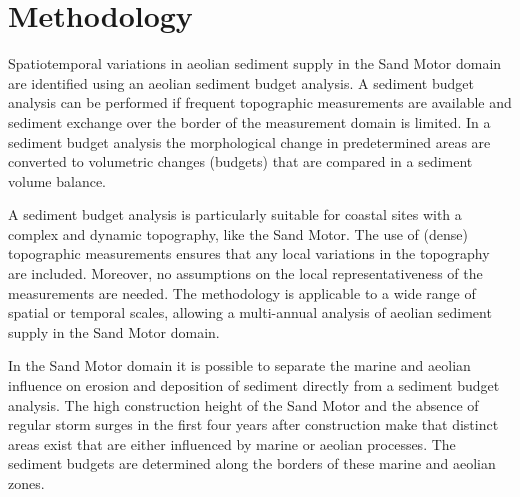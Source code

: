 \section{Methodology}

Spatiotemporal variations in aeolian sediment supply in the Sand Motor
domain are identified using an aeolian sediment budget analysis. A
sediment budget analysis can be performed if frequent topographic
measurements are available \citep{DavidsonArnott1990} and sediment
exchange over the border of the measurement domain is limited. In a
sediment budget analysis the morphological change in predetermined
areas are converted to volumetric changes (budgets) that are compared
in a sediment volume balance.

A sediment budget analysis is particularly suitable for coastal sites
with a complex and dynamic topography, like the Sand Motor. The use of
(dense) topographic measurements ensures that any local variations in
the topography are included. Moreover, no assumptions on the local
representativeness of the measurements are needed. The methodology is
applicable to a wide range of spatial or temporal scales, allowing a
multi-annual analysis of aeolian sediment supply in the Sand Motor
domain.

In the Sand Motor domain it is possible to separate the marine and
aeolian influence on erosion and deposition of sediment directly from
a sediment budget analysis. The high construction height of the Sand
Motor and the absence of regular storm surges in the first four years
after construction make that distinct areas exist that are either
influenced by marine or aeolian processes. The sediment budgets are
determined along the borders of these marine and aeolian zones.

%
%

